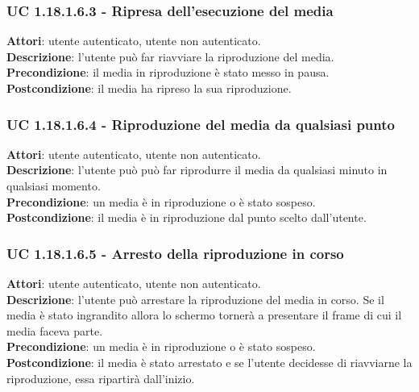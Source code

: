 	\subsubsection{UC 1.18.1.6.3 - Ripresa dell'esecuzione del media}{
		\label{uc1.18.1.6.3}
		\textbf{Attori}: utente autenticato, utente non autenticato. \\
		\textbf{Descrizione}: l'utente può far riavviare la riproduzione del media. \\
		\textbf{Precondizione}: il media in riproduzione è stato messo in pausa.	\\
		\textbf{Postcondizione}: il media ha ripreso la sua riproduzione.	\\
	}
	\subsubsection{UC 1.18.1.6.4 - Riproduzione del media da qualsiasi punto}{
		\label{uc1.18.1.6.4}
		\textbf{Attori}: utente autenticato, utente non autenticato. \\
		\textbf{Descrizione}: l'utente può può far riprodurre il media da qualsiasi minuto in qualsiasi momento. \\
		\textbf{Precondizione}: un media è in riproduzione o è stato sospeso.	\\
		\textbf{Postcondizione}: il media è in riproduzione dal punto scelto dall'utente.	\\
	}
	\subsubsection{UC 1.18.1.6.5 - Arresto della riproduzione in corso}{
		\label{uc1.18.1.6.5}
		\textbf{Attori}: utente autenticato, utente non autenticato. \\
		\textbf{Descrizione}: l'utente può arrestare la riproduzione del media in corso. Se il media è stato ingrandito allora lo schermo tornerà a presentare il frame di cui il media faceva parte. \\
		\textbf{Precondizione}: un media è in riproduzione o è stato sospeso.	\\
		\textbf{Postcondizione}: il media è stato arrestato e se l'utente decidesse di riavviarne la riproduzione, essa ripartirà dall'inizio.	\\
	}
